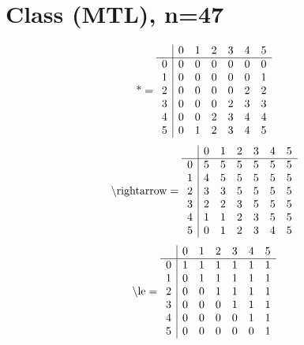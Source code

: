 \documentclass[11pt]{article}
\begin{document}
\section{Class (MTL), n=47}
\[\text{*} = 
\begin{array}{r | r r r r r r}
 & 0 & 1 & 2 & 3 & 4 & 5 \\ \hline
0 & 0 & 0 & 0 & 0 & 0 & 0 \\
1 & 0 & 0 & 0 & 0 & 0 & 1 \\
2 & 0 & 0 & 0 & 0 & 2 & 2 \\
3 & 0 & 0 & 0 & 2 & 3 & 3 \\
4 & 0 & 0 & 2 & 3 & 4 & 4 \\
5 & 0 & 1 & 2 & 3 & 4 & 5 \\
\end{array}
\]
\[\text{\textbackslash rightarrow} = 
\begin{array}{r | r r r r r r}
 & 0 & 1 & 2 & 3 & 4 & 5 \\ \hline
0 & 5 & 5 & 5 & 5 & 5 & 5 \\
1 & 4 & 5 & 5 & 5 & 5 & 5 \\
2 & 3 & 3 & 5 & 5 & 5 & 5 \\
3 & 2 & 2 & 3 & 5 & 5 & 5 \\
4 & 1 & 1 & 2 & 3 & 5 & 5 \\
5 & 0 & 1 & 2 & 3 & 4 & 5 \\
\end{array}
\]
\[\text{\textbackslash le} = 
\begin{array}{r | r r r r r r}
 & 0 & 1 & 2 & 3 & 4 & 5 \\ \hline
0 & 1 & 1 & 1 & 1 & 1 & 1 \\
1 & 0 & 1 & 1 & 1 & 1 & 1 \\
2 & 0 & 0 & 1 & 1 & 1 & 1 \\
3 & 0 & 0 & 0 & 1 & 1 & 1 \\
4 & 0 & 0 & 0 & 0 & 1 & 1 \\
5 & 0 & 0 & 0 & 0 & 0 & 1 \\
\end{array}
\]
\end{document}
